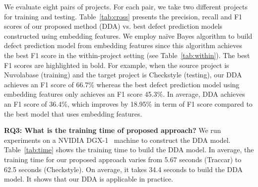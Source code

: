 We evaluate eight pairs of projects. For each pair, we take two different projects for training and testing. Table~\ref{tab:cross} presents the precision, recall and F1 scores of our proposed method (DDA) vs. best defect prediction models constructed using embedding features. We employ na\"{i}ve Bayes algorithm to build defect prediction model from embedding features since this algorithm achieves the best F1 score in the within-project setting (see Table~\ref{tab:within}). The best F1 scores are highlighted in bold. For example, when the source project is Nuvolabase (training) and the target project is Checkstyle (testing), our DDA achieves an F1 score of 66.7\% whereas the best defect prediction model using embedding features only achieves an F1 score 45.3\%. In average, DDA achieves an F1 score of 36.4\%, which improves by 18.95\% in term of F1 score compared to the best model that uses embedding features. 

\textbf{RQ3: What is the training time of proposed approach?}
We run experiments on a NVIDIA DGX-1~\cite{nvidia} machine to construct the DDA model. 
Table~\ref{tab:time} shows the training time to build the DDA model. In average, the training time for our proposed approach varies from 5.67 seconds (Traccar) to 62.5 seconds (Checkstyle). On average, it takes 34.4 seconds to build the DDA model. It shows that our DDA is applicable in practice.


